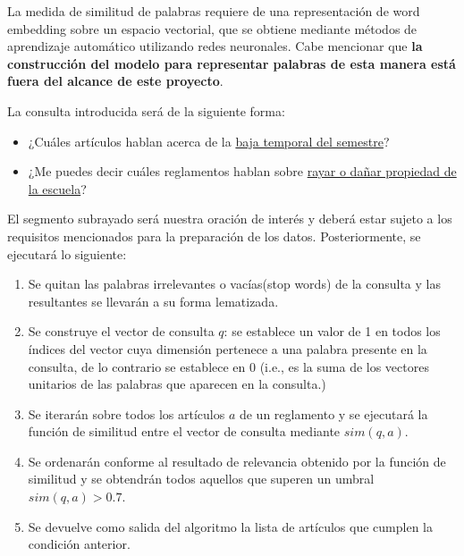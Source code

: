 La medida de similitud de palabras requiere de una representación de word embedding sobre un espacio vectorial, que se obtiene mediante métodos de aprendizaje automático utilizando redes neuronales. Cabe mencionar que \textbf{la construcción del modelo para representar palabras de esta manera está fuera del alcance de este proyecto}.

La consulta introducida será de la siguiente forma:

\begin{itemize}
    \item ¿Cuáles artículos hablan acerca de la \underline{baja temporal del semestre}?
    \item ¿Me puedes decir cuáles reglamentos hablan sobre \underline{rayar o dañar propiedad de la escuela}?
\end{itemize}

El segmento subrayado será nuestra oración de interés y deberá estar sujeto a los requisitos mencionados para la preparación de los datos. Posteriormente, se ejecutará lo siguiente:

\begin{enumerate}
    \item Se quitan las palabras irrelevantes o vacías(stop words) de la consulta y las resultantes se llevarán a su forma lematizada.
    \item Se construye el vector de consulta $q$: se establece un valor de 1 en todos los índices del vector cuya dimensión pertenece a una palabra presente en la consulta, de lo contrario se establece en 0 (i.e., es la suma de los vectores unitarios de las palabras que aparecen en la consulta.)
    \item Se iterarán sobre todos los artículos $a$ de un reglamento y se ejecutará la función de similitud entre el vector de consulta mediante $sim(q, a)$.
    \item Se ordenarán conforme al resultado de relevancia obtenido por la función de similitud y se obtendrán todos aquellos que superen un umbral $sim(q, a)  > 0.7$.
    \item Se devuelve como salida del algoritmo la lista de artículos que cumplen la condición anterior.
\end{enumerate}

